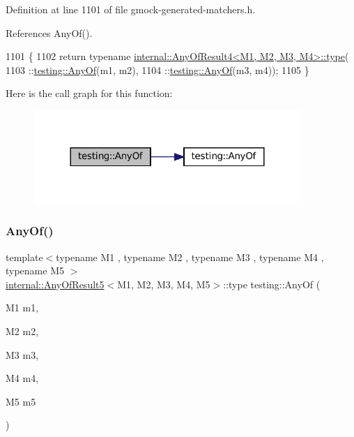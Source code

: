 Definition at line 1101 of file gmock-\/generated-\/matchers.\+h.



References Any\+Of().


\begin{DoxyCode}
1101                                   \{
1102   \textcolor{keywordflow}{return} \textcolor{keyword}{typename} \hyperlink{namespacegenerate__debs_a50bc9a7ecac9584553e089a448bcde58}{internal::AnyOfResult4<M1, M2, M3, M4>::type}(
1103       ::\hyperlink{namespacetesting_a81cfefd9f75cdce827d5bc873cf73aac}{testing::AnyOf}(m1, m2),
1104       ::\hyperlink{namespacetesting_a81cfefd9f75cdce827d5bc873cf73aac}{testing::AnyOf}(m3, m4));
1105 \}
\end{DoxyCode}
Here is the call graph for this function\+:
\nopagebreak
\begin{figure}[H]
\begin{center}
\leavevmode
\includegraphics[width=288pt]{namespacetesting_a1cfcacf2cf19543b86445e3585d5356f_cgraph}
\end{center}
\end{figure}
\mbox{\label{namespacetesting_a049ea436e52c242adc44b2b42dc03e50}} 
\subsubsection{\texorpdfstring{Any\+Of()}{AnyOf()}\hspace{0.1cm}{\footnotesize\ttfamily [4/9]}}
{\footnotesize\ttfamily template$<$typename M1 , typename M2 , typename M3 , typename M4 , typename M5 $>$ \\
\hyperlink{structtesting_1_1internal_1_1AnyOfResult5}{internal\+::\+Any\+Of\+Result5}$<$M1, M2, M3, M4, M5$>$\+::type testing\+::\+Any\+Of (\begin{DoxyParamCaption}\item[{M1}]{m1,  }\item[{M2}]{m2,  }\item[{M3}]{m3,  }\item[{M4}]{m4,  }\item[{M5}]{m5 }\end{DoxyParamCaption})\hspace{0.3cm}{\ttfamily [inline]}}



